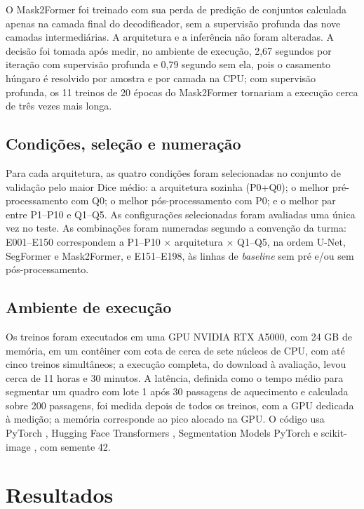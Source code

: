 \documentclass[12pt]{article}
\begin{document}
O Mask2Former foi treinado com sua perda de predição de conjuntos calculada apenas na camada final do decodificador, sem a supervisão profunda das nove camadas intermediárias. A arquitetura e a inferência não foram alteradas. A decisão foi tomada após medir, no ambiente de execução, 2,67 segundos por iteração com supervisão profunda e 0,79 segundo sem ela, pois o casamento húngaro é resolvido por amostra e por camada na CPU; com supervisão profunda, os 11 treinos de 20 épocas do Mask2Former tornariam a execução cerca de três vezes mais longa.

\subsection{Condições, seleção e numeração}
\label{subsec:condicoes}

Para cada arquitetura, as quatro condições foram selecionadas no conjunto de validação pelo maior Dice médio: a arquitetura sozinha (P0+Q0); o melhor pré-processamento com Q0; o melhor pós-processamento com P0; e o melhor par entre P1--P10 e Q1--Q5. As configurações selecionadas foram avaliadas uma única vez no teste. As combinações foram numeradas segundo a convenção da turma: E001--E150 correspondem a P1--P10 $\times$ arquitetura $\times$ Q1--Q5, na ordem U-Net, SegFormer e Mask2Former, e E151--E198, às linhas de \textit{baseline} sem pré e/ou sem pós-processamento.

\subsection{Ambiente de execução}
\label{subsec:ambiente}

Os treinos foram executados em uma GPU NVIDIA RTX A5000, com 24 GB de memória, em um contêiner com cota de cerca de sete núcleos de CPU, com até cinco treinos simultâneos; a execução completa, do download à avaliação, levou cerca de 11 horas e 30 minutos. A latência, definida como o tempo médio para segmentar um quadro com lote 1 após 30 passagens de aquecimento e calculada sobre 200 passagens, foi medida depois de todos os treinos, com a GPU dedicada à medição; a memória corresponde ao pico alocado na GPU. O código usa PyTorch \cite{paszke2019pytorch}, Hugging Face Transformers \cite{wolf2020transformers}, Segmentation Models PyTorch \cite{iakubovskii2019smp} e scikit-image \cite{vanderwalt2014skimage}, com semente 42.

\section{Resultados}
\label{sec:resultados}
\end{document}
